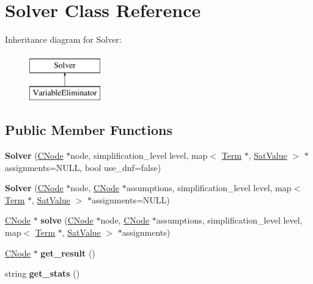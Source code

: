 \hypertarget{classSolver}{\section{\-Solver \-Class \-Reference}
\label{classSolver}
}
\-Inheritance diagram for \-Solver\-:\begin{figure}[H]
\begin{center}
\leavevmode
\includegraphics[height=2.000000cm]{classSolver}
\end{center}
\end{figure}
\subsection*{\-Public \-Member \-Functions}
\begin{DoxyCompactItemize}
\item 
\hypertarget{classSolver_a39f7b0b596e4ab7936b316e37a457035}{{\bfseries \-Solver} (\hyperlink{classCNode}{\-C\-Node} $\ast$node, simplification\-\_\-level level, map$<$ \hyperlink{classTerm}{\-Term} $\ast$, \hyperlink{classSatValue}{\-Sat\-Value} $>$ $\ast$assignments=\-N\-U\-L\-L, bool use\-\_\-dnf=false)}\label{classSolver_a39f7b0b596e4ab7936b316e37a457035}

\item 
\hypertarget{classSolver_a0d11a686e70c88fb02cb3556952f9589}{{\bfseries \-Solver} (\hyperlink{classCNode}{\-C\-Node} $\ast$node, \hyperlink{classCNode}{\-C\-Node} $\ast$assumptions, simplification\-\_\-level level, map$<$ \hyperlink{classTerm}{\-Term} $\ast$, \hyperlink{classSatValue}{\-Sat\-Value} $>$ $\ast$assignments=\-N\-U\-L\-L)}\label{classSolver_a0d11a686e70c88fb02cb3556952f9589}

\item 
\hypertarget{classSolver_a75acae58b51db12008c3128c37b0ef9a}{\hyperlink{classCNode}{\-C\-Node} $\ast$ {\bfseries solve} (\hyperlink{classCNode}{\-C\-Node} $\ast$node, \hyperlink{classCNode}{\-C\-Node} $\ast$assumptions, simplification\-\_\-level level, map$<$ \hyperlink{classTerm}{\-Term} $\ast$, \hyperlink{classSatValue}{\-Sat\-Value} $>$ $\ast$assignments)}\label{classSolver_a75acae58b51db12008c3128c37b0ef9a}

\item 
\hypertarget{classSolver_a7b24ed5645557b5c44aef05b265bf1ca}{\hyperlink{classCNode}{\-C\-Node} $\ast$ {\bfseries get\-\_\-result} ()}\label{classSolver_a7b24ed5645557b5c44aef05b265bf1ca}

\item 
\hypertarget{classSolver_a59e014be51c7dedaf0ea98357a70b158}{string {\bfseries get\-\_\-stats} ()}\label{classSolver_a59e014be51c7dedaf0ea98357a70b158}

\end{DoxyCompactItemize}
